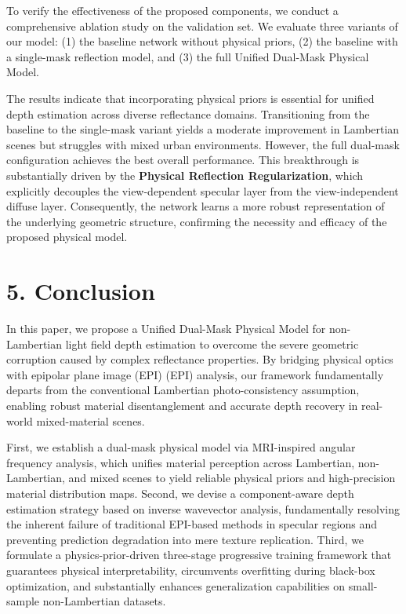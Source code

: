 \documentclass[lettersize,journal]{IEEEtran}
\begin{document}
To verify the effectiveness of the proposed components, we conduct a comprehensive ablation study on the validation set. We evaluate three variants of our model: (1) the baseline network without physical priors, (2) the baseline with a single-mask reflection model, and (3) the full Unified Dual-Mask Physical Model. 

The results indicate that incorporating physical priors is essential for unified depth estimation across diverse reflectance domains. Transitioning from the baseline to the single-mask variant yields a moderate improvement in Lambertian scenes but struggles with mixed urban environments. However, the full dual-mask configuration achieves the best overall performance. This breakthrough is substantially driven by the \textbf{Physical Reflection Regularization}, which explicitly decouples the view-dependent specular layer from the view-independent diffuse layer. Consequently, the network learns a more robust representation of the underlying geometric structure, confirming the necessity and efficacy of the proposed physical model.

\section{5. Conclusion}


In this paper, we propose a Unified Dual-Mask Physical Model for non-Lambertian light field depth estimation to overcome the severe geometric corruption caused by complex reflectance properties. By bridging physical optics with epipolar plane image (EPI) (EPI) analysis, our framework fundamentally departs from the conventional Lambertian photo-consistency assumption, enabling robust material disentanglement and accurate depth recovery in real-world mixed-material scenes. 

First, we establish a dual-mask physical model via MRI-inspired angular frequency analysis, which unifies material perception across Lambertian, non-Lambertian, and mixed scenes to yield reliable physical priors and high-precision material distribution maps. Second, we devise a component-aware depth estimation strategy based on inverse wavevector analysis, fundamentally resolving the inherent failure of traditional EPI-based methods in specular regions and preventing prediction degradation into mere texture replication. Third, we formulate a physics-prior-driven three-stage progressive training framework that guarantees physical interpretability, circumvents overfitting during black-box optimization, and substantially enhances generalization capabilities on small-sample non-Lambertian datasets. 
\end{document}
